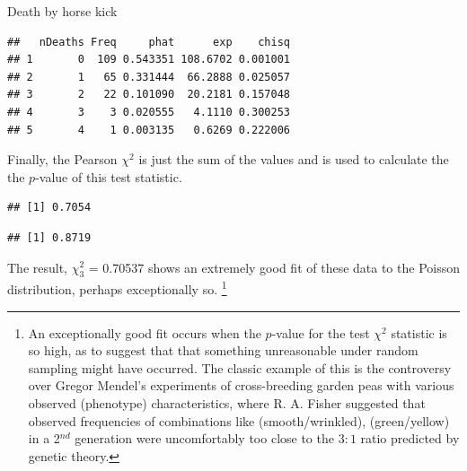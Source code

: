 \documentclass[11pt]{book}
\renewenvironment{knitrout}{\small\renewcommand{\baselinestretch}{.85}}{} %
\begin{document}
\begin{Example}[horsekick3]{Death by horse kick}
\begin{knitrout}
\begin{kframe}
\begin{alltt}
 \hlkwb{<-} 
\end{alltt}
\begin{verbatim}
##   nDeaths Freq     phat      exp    chisq
## 1       0  109 0.543351 108.6702 0.001001
## 2       1   65 0.331444  66.2888 0.025057
## 3       2   22 0.101090  20.2181 0.157048
## 4       3    3 0.020555   4.1110 0.300253
## 5       4    1 0.003135   0.6269 0.222006
\end{verbatim}
\end{kframe}
\end{knitrout}
Finally, the Pearson $\chi^2$ is just the sum of the 
values and  is used to calculate the the
$p$-value of this test statistic.

\begin{knitrout}
\color{fgcolor}\begin{kframe}
\begin{alltt}
  
\end{alltt}
\begin{verbatim}
## [1] 0.7054
\end{verbatim}
\begin{alltt}
\hlstd{(} \hlstd{=}\hlopt{-}\hlstd{,} \hlstd{=}\hlstd{)}
\end{alltt}
\begin{verbatim}
## [1] 0.8719
\end{verbatim}
\end{kframe}
\end{knitrout}
The result, $\chi^2_3$ = 0.70537 shows an 
extremely good fit of these data to the Poisson distribution,
perhaps exceptionally so.%
\footnote{
An exceptionally good fit occurs when the $p$-value for
the test $\chi^2$ statistic is so high, as to suggest that
that something unreasonable under random sampling might have
occurred.  The classic example of this is the 
controversy over Gregor Mendel's experiments of cross-breeding
garden peas with various observed (phenotype) characteristics,
where R. A. Fisher \citeyear{Fisher:1936:Mendel} suggested that
observed frequencies of combinations like (smooth/wrinkled),
(green/yellow) in a 2$^{nd}$ generation were uncomfortably too
close to the $3:1$ ratio predicted by genetic theory.  
}

\end{Example}
\end{document}
